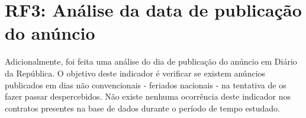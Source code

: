 \section{RF3: Análise da data de publicação do anúncio}

Adicionalmente, foi feita uma análise do dia de publicação do anúncio em Diário da República. O objetivo deste indicador é verificar se existem anúncios publicados em dias não convencionais - feriados nacionais - na tentativa de os fazer passar despercebidos. Não existe nenhuma ocorrência deste indicador nos contratos presentes na base de dados durante o período de tempo estudado. 






































